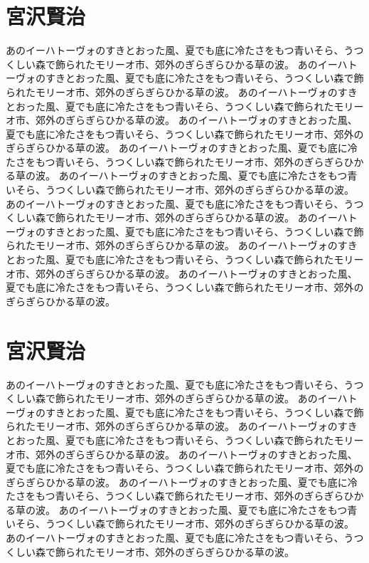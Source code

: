 \documentclass[b5j,12pt]{ltjsbook}
\begin{document}
\section{宮沢賢治}

あのイーハトーヴォのすきとおった風、夏でも底に冷たさをもつ青いそら、うつくしい森で飾られたモリーオ市、郊外のぎらぎらひかる草の波。
あのイーハトーヴォのすきとおった風、夏でも底に冷たさをもつ青いそら、うつくしい森で飾られたモリーオ市、郊外のぎらぎらひかる草の波。
あのイーハトーヴォのすきとおった風、夏でも底に冷たさをもつ青いそら、うつくしい森で飾られたモリーオ市、郊外のぎらぎらひかる草の波。
あのイーハトーヴォのすきとおった風、夏でも底に冷たさをもつ青いそら、うつくしい森で飾られたモリーオ市、郊外のぎらぎらひかる草の波。
あのイーハトーヴォのすきとおった風、夏でも底に冷たさをもつ青いそら、うつくしい森で飾られたモリーオ市、郊外のぎらぎらひかる草の波。
あのイーハトーヴォのすきとおった風、夏でも底に冷たさをもつ青いそら、うつくしい森で飾られたモリーオ市、郊外のぎらぎらひかる草の波。
あのイーハトーヴォのすきとおった風、夏でも底に冷たさをもつ青いそら、うつくしい森で飾られたモリーオ市、郊外のぎらぎらひかる草の波。
あのイーハトーヴォのすきとおった風、夏でも底に冷たさをもつ青いそら、うつくしい森で飾られたモリーオ市、郊外のぎらぎらひかる草の波。
あのイーハトーヴォのすきとおった風、夏でも底に冷たさをもつ青いそら、うつくしい森で飾られたモリーオ市、郊外のぎらぎらひかる草の波。
あのイーハトーヴォのすきとおった風、夏でも底に冷たさをもつ青いそら、うつくしい森で飾られたモリーオ市、郊外のぎらぎらひかる草の波。

\section{宮沢賢治}

あのイーハトーヴォのすきとおった風、夏でも底に冷たさをもつ青いそら、うつくしい森で飾られたモリーオ市、郊外のぎらぎらひかる草の波。
あのイーハトーヴォのすきとおった風、夏でも底に冷たさをもつ青いそら、うつくしい森で飾られたモリーオ市、郊外のぎらぎらひかる草の波。
あのイーハトーヴォのすきとおった風、夏でも底に冷たさをもつ青いそら、うつくしい森で飾られたモリーオ市、郊外のぎらぎらひかる草の波。
あのイーハトーヴォのすきとおった風、夏でも底に冷たさをもつ青いそら、うつくしい森で飾られたモリーオ市、郊外のぎらぎらひかる草の波。
あのイーハトーヴォのすきとおった風、夏でも底に冷たさをもつ青いそら、うつくしい森で飾られたモリーオ市、郊外のぎらぎらひかる草の波。
あのイーハトーヴォのすきとおった風、夏でも底に冷たさをもつ青いそら、うつくしい森で飾られたモリーオ市、郊外のぎらぎらひかる草の波。
あのイーハトーヴォのすきとおった風、夏でも底に冷たさをもつ青いそら、うつくしい森で飾られたモリーオ市、郊外のぎらぎらひかる草の波。
\end{document}
